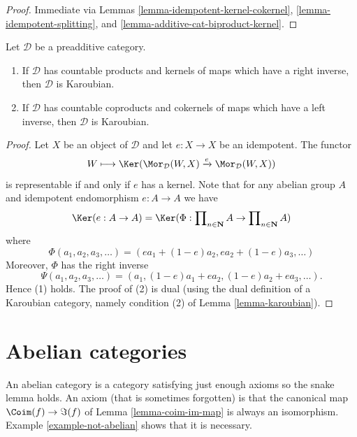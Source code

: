 \begin{proof}
Immediate via Lemmas \ref{lemma-idempotent-kernel-cokernel},
\ref{lemma-idempotent-splitting}, and \ref{lemma-additive-cat-biproduct-kernel}.
\end{proof}

\begin{lemma}
\label{lemma-projectors-have-images}
Let $\mathcal{D}$ be a preadditive category.
\begin{enumerate}
\item If $\mathcal{D}$ has countable products and kernels of maps which
have a right inverse, then $\mathcal{D}$ is Karoubian.
\item If $\mathcal{D}$ has countable coproducts and cokernels of
maps which have a left inverse, then $\mathcal{D}$ is Karoubian.
\end{enumerate}
\end{lemma}

\begin{proof}
Let $X$ be an object of $\mathcal{D}$ and let $e : X \to X$ be an idempotent.
The functor
$$
W \longmapsto \Ker(
\Mor_\mathcal{D}(W, X)
\xrightarrow{e}
\Mor_\mathcal{D}(W, X)
)
$$
is representable if and only if $e$ has a kernel. Note that for any
abelian group $A$ and idempotent endomorphism $e : A \to A$ we have
$$
\Ker(e : A \to A)
= \Ker(\Phi :
\prod\nolimits_{n \in \mathbf{N}} A
\to
\prod\nolimits_{n \in \mathbf{N}} A
)
$$
where
$$
\Phi(a_1, a_2, a_3, \ldots) = (ea_1 + (1 - e)a_2, ea_2 + (1 - e)a_3, \ldots)
$$
Moreover, $\Phi$ has the right inverse
$$
\Psi(a_1, a_2, a_3, \ldots) =
(a_1, (1 - e)a_1 + ea_2, (1 - e)a_2 + ea_3, \ldots).
$$
Hence (1) holds. The proof of (2) is dual (using the dual definition
of a Karoubian category, namely condition (2) of
Lemma \ref{lemma-karoubian}).
\end{proof}









\section{Abelian categories}
\label{section-abelian-categories}

\noindent
An abelian category is a category satisfying just enough axioms so the
snake lemma holds. An axiom (that is sometimes forgotten)
is that the canonical map $\Coim(f) \to \Im(f)$
of Lemma \ref{lemma-coim-im-map} is always an isomorphism.
Example \ref{example-not-abelian} shows that it is necessary.

